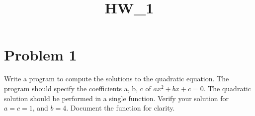 \documentclass{article}
\title{HW\_1}
\begin{document}
    
    
    \maketitle
    
    

    

    \section{Problem 1}


    Write a program to compute the solutions to the quadratic equation. The
program should specify the coefficients a, b, c of $ax^2+bx+c=0$. The
quadratic solution should be performed in a single function. Verify your
solution for $a=c=1$, and $b=4$. Document the function for clarity.
\end{document}
